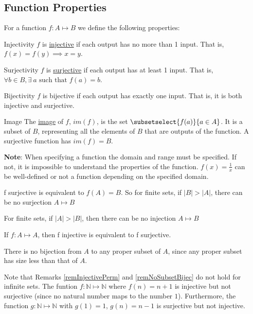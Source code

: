 \documentclass[../Main.tex]{subfiles}
\begin{document}
\subsection{Function Properties}
For a function $f : A \mapsto B$ we define the following properties:
\begin{definition}{Injectivity}
    $f$ is \underline{injective} if each output has no more than 1 input. That is, $f(x) = f(y) \implies x = y$.
\end{definition}
\begin{definition}{Surjectivity}
    $f$ is \underline{surjective} if each output has at least 1 input. That is, $\forall b \in B, \exists~a \text{ such that } f(a) = b$.
\end{definition}
\begin{definition}{Bijectivity}
    $f$ is bijective if each output has exactly one input. That is, it is both injective and surjective.
\end{definition}
\begin{definition}{Image}
    The \underline{image} of $f$, $im(f)$, is the set $\subsetselect{f(a)}{a \in A}$. It is a subset of $B$, representing all the elements of $B$ that are outputs of the function. A surjective function has $im(f) = B$.
\end{definition}
\textbf{Note}: When specifying a function the domain and range must be specified. If not, it is impossible to understand the properties of the function. $f(x) = \frac{1}{x}$ can be well-defined or not a function depending on the specified domain.\par
\begin{remarks}
    \item f surjective is equivalent to $f(A) = B$. So for finite sets, if $|B|>|A|$, there can be no surjection $A \mapsto B$
    \item For finite sets, if $|A|>|B|$, then there can be no injection $A \mapsto B$
    \item If $f:A \mapsto A$, then f injective is equivalent to f surjective.\label{remInjectivePerm}
    \item There is no bijection from $A$ to any proper subset of $A$, since any proper subset has size less than that of $A$.\label{remNoSubsetBijec}
\end{remarks}
Note that Remarks \ref{remInjectivePerm} and \ref{remNoSubsetBijec} do not hold for infinite sets. The funtion $f : \mathbb{N} \mapsto \mathbb{N}$ where $f(n) = n + 1$ is injective but not surjective (since no natural number maps to the number $1$). Furthermore, the function $g : \mathbb{N} \mapsto \mathbb{N}$ with $g(1) = 1$, $g(n) = n-1$ is surjective but not injective.\par
\end{document}

